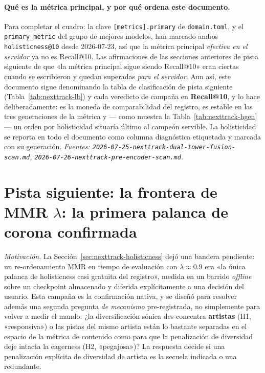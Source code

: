 \documentclass[11pt]{article}
\begin{document}
\paragraph{Qué es la métrica principal, y por qué ordena este documento.} Para
completar el cuadro: la clave \texttt{[metrics].primary} de \texttt{domain.toml},
y el \texttt{primary\_metric} del grupo de mejores modelos, han marcado ambos
\texttt{holisticness@10} desde 2026-07-23, así que la métrica principal
\emph{efectiva en el servidor} ya no es Recall@10. Las afirmaciones de las
secciones anteriores de pista siguiente de que «la métrica principal sigue
siendo Recall@10» eran ciertas cuando se escribieron y quedan superadas
\emph{para el servidor}. Aun así, este documento sigue denominando la tabla de
clasificación de pista siguiente
(Tabla~\ref{tab:nexttrack-lb}) y cada veredicto de campaña en \textbf{Recall@10}, y lo hace
deliberadamente: es la moneda de comparabilidad del registro, es estable en las
tres generaciones de la métrica y --- como muestra la Tabla~\ref{tab:nexttrack-hgen} --- un
orden por holisticidad situaría último al campeón servible. La holisticidad se
reporta en todo el documento como columna diagnóstica etiquetada y marcada con su
generación.
\emph{Fuentes: \texttt{2026-07-25-nexttrack-dual-tower-fusion-scan.md},
\texttt{2026-07-26-nexttrack-pre-encoder-scan.md}.}

\section{Pista siguiente: la frontera de MMR $\lambda$: la primera palanca de corona confirmada}
\label{sec:nexttrack-mmr}
\emph{Motivación.} La Sección~\ref{sec:nexttrack-holisticness} dejó una bandera pendiente:
un re-ordenamiento MMR en tiempo de evaluación con $\lambda\approx\num{0.9}$ era
«la única palanca de holisticness casi gratuita del registro», medida en un barrido
\emph{offline} sobre un checkpoint almacenado y diferida explícitamente a una
decisión del usuario. Esta campaña es la confirmación nativa, y se diseñó para
resolver además una segunda pregunta \emph{de mecanismo} pre-registrada, no
simplemente para volver a medir el mando: ¿la diversificación sónica
des-concentra \textbf{artistas} (H1, «responsiva») o las pistas del mismo artista
están lo bastante separadas en el espacio de la métrica de contenido como para que
la penalización de diversidad deje intacta la eagerness (H2, «pegajosa»)? La
respuesta decide si una penalización explícita de diversidad de artista es la
secuela indicada o una redundante.
\end{document}

